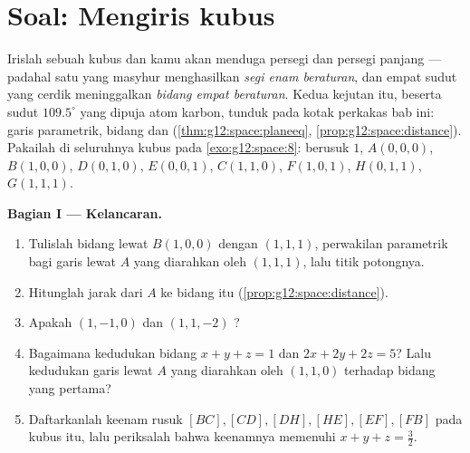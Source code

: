 \section{Soal: Mengiris kubus}

\begin{problem}
\label{pb:g12:space:1}
Irislah sebuah kubus dan kamu akan menduga persegi dan persegi panjang --- padahal satu
 yang masyhur menghasilkan \emph{segi enam beraturan}, dan empat 
sudut yang cerdik meninggalkan \emph{bidang empat beraturan}. Kedua
kejutan itu, beserta sudut $109.5^\circ$ yang dipuja atom karbon,
tunduk pada kotak perkakas bab ini: garis parametrik,  bidang
dan  (\cref{thm:g12:space:planeeq},
\cref{prop:g12:space:distance}). Pakailah di seluruhnya kubus pada
\cref{exo:g12:space:8}: berusuk $1$, $A(0,0,0)$, $B(1,0,0)$,
$D(0,1,0)$, $E(0,0,1)$, $C(1,1,0)$, $F(1,0,1)$, $H(0,1,1)$,
$G(1,1,1)$.

\medskip
\noindent\textbf{Bagian I --- Kelancaran.}
\begin{enumerate}
  \item Tulislah  bidang lewat $B(1,0,0)$ dengan
         $(1,1,1)$, perwakilan parametrik bagi
        garis lewat $A$ yang diarahkan oleh $(1,1,1)$, lalu
        titik potongnya.
  \item Hitunglah jarak dari $A$ ke bidang itu
        (\cref{prop:g12:space:distance}).
  \item Apakah  $(1,-1,0)$ dan $(1,1,-2)$ ?
  \item Bagaimana kedudukan bidang $x + y + z = 1$ dan
        $2x + 2y + 2z = 5$? Lalu kedudukan garis lewat $A$ yang diarahkan oleh
        $(1,1,0)$ terhadap bidang yang pertama?
  \item Daftarkanlah  keenam rusuk
        $[BC], [CD], [DH], [HE], [EF], [FB]$ pada kubus itu, lalu
        periksalah bahwa keenamnya memenuhi 
        $x + y + z = \frac32$.
\end{enumerate}


\end{problem}
